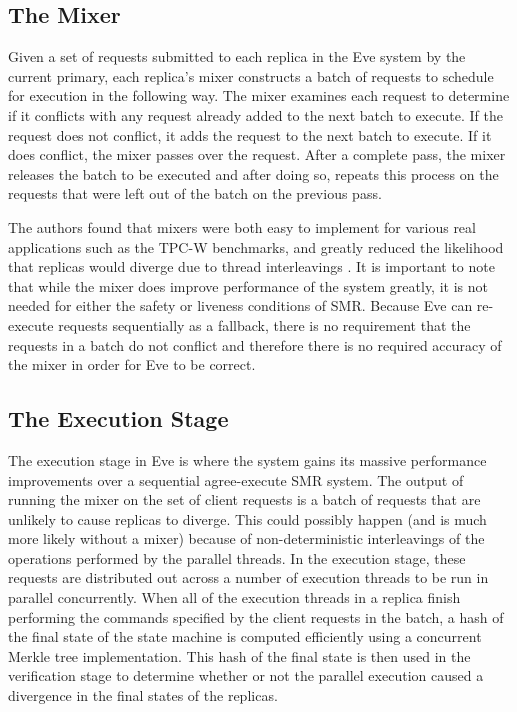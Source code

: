 \documentclass[11pt, oneside]{report}
\begin{document}
\subsection{The Mixer}\label{EveMixer}
Given a set of requests submitted to each replica in the Eve system by the current primary, each replica's mixer constructs a batch of requests to schedule for execution in the following way. 
The mixer examines each request to determine if it conflicts with any request already added to the next batch to execute. 
If the request does not conflict, it adds the request to the next batch to execute. 
If it does conflict, the mixer passes over the request. 
After a complete pass, the mixer releases the batch to be executed and after doing so, repeats this process on the requests that were left out of the batch on the previous pass.

The authors found that mixers were both easy to implement for various real applications such as the TPC-W benchmarks, and greatly reduced the likelihood that replicas would diverge due to thread interleavings \cite{eve}. 
It is important to note that while the mixer does improve performance of the system greatly, it is not needed for either the safety or liveness conditions of SMR. 
Because Eve can re-execute requests sequentially as a fallback, there is no requirement that the requests in a batch do not conflict and therefore there is no required accuracy of the mixer in order for Eve to be correct.

\subsection{The Execution Stage}\label{EveExecution}

The execution stage in Eve is where the system gains its massive performance improvements over a sequential agree-execute SMR system. 
The output of running the mixer on the set of client requests is a batch of requests that are unlikely to cause replicas to diverge. 
This could possibly happen (and is much more likely without a mixer) because of non-deterministic interleavings of the operations performed by the parallel threads.
In the execution stage, these requests are distributed out across a number of execution threads to be run in parallel concurrently. 
When all of the execution threads in a replica finish performing the commands specified by the client requests in the batch, a hash of the final state of the state machine is computed efficiently using a concurrent Merkle tree implementation. 
This hash of the final state is then used in the verification stage to determine whether or not the parallel execution caused a divergence in the final states of the replicas.
\end{document}
